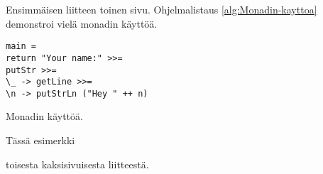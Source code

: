 \documentclass[language=finnish,version=final,mainfont=none,sharelatex=false]{utuftthesis}
\begin{document}
\newpage{}

Ensimmäisen liitteen toinen sivu. Ohjelmalistaus \ref{alg:Monadin-kayttoa}
demonstroi vielä monadin käyttöä.

\begin{algorithm}[tbh]
\begin{verbatim}
main =
return "Your name:" >>=
putStr >>=
\_ -> getLine >>=
\n -> putStrLn ("Hey " ++ n)
\end{verbatim}

\caption{Monadin käyttöä.\label{alg:Monadin-kayttoa}}
\end{algorithm}



Tässä esimerkki\pagebreak{}

toisesta kaksisivuisesta liitteestä.
\end{document}
